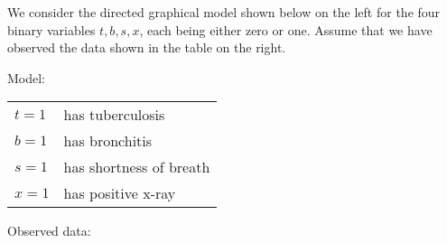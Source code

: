 
 We consider the directed graphical model shown below on the left for
 the four binary variables $t,b,s,x$, each being either zero or
 one. Assume that we have observed the data shown in the table on the
 right.\\
 
  \begin{minipage}[t]{0.45 \textwidth}
    \begin{center}
      {\small Model:\\[2ex]}
    \end{center}\vspace{2ex}
    \begin{tabular}{l l}
    $t=1$& has tuberculosis\\
    $b=1$& has bronchitis \\
    $s=1$& has shortness of breath\\
      $x=1$& has positive x-ray
    \end{tabular}
  \end{minipage}
  \hspace{2ex}
  \begin{minipage}[t]{0.45\textwidth}
    \begin{center}
      {\small Observed data:\\[2ex]}
    \end{center}
  \end{minipage}\\[2ex]
